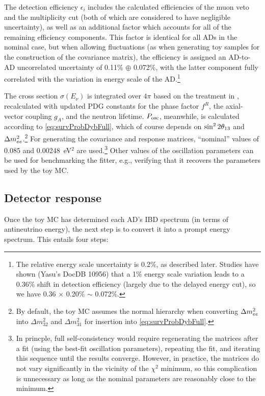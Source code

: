 \documentclass[../thesis.tex]{subfiles}
\begin{document}
The detection efficiency $\epsilon_i$ includes the calculated efficiencies of
the muon veto and the multiplicity cut (both of which are considered to have
negligible uncertainty), as well as an additional factor which accounts for all
of the remaining efficiency components. This factor is identical for all ADs in
the nominal case, but when allowing fluctuations (as when generating toy samples
for the construction of the covariance matrix), the efficiency is assigned an
AD-to-AD uncorrelated uncertainty of 0.11\% $\oplus$ 0.072\%, with the latter
component fully correlated with the variation in energy scale of the
AD.\footnote{The relative energy scale uncertainty is 0.2\%, as described
  later. Studies have shown (Yasu's DocDB 10956) that a 1\% energy scale
  variation leads to a 0.36\% shift in detection efficiency (largely due to the
  delayed energy cut), so we have 0.36 $\times$ 0.20\% $\sim$ 0.072\%.}

The cross section $\sigma(E_\nu)$ is integrated over $4\pi$ based on the
treatment in \cite{Vogel_1999}, recalculated with updated PDG constants for the
phase factor $f^R$, the axial-vector coupling $g_A$, and the neutron
lifetime. $P_\mathrm{osc}$, meanwhile, is calculated according to
\autoref{eq:survProbDybFull}, which of course depends on $\sin^2 2\theta_{13}$ and
$\Delta m^2_{ee}$.\footnote{By default, the toy MC assumes the normal hierarchy when
  converting $\Delta m^2_{ee}$ into $\Delta m^2_{32}$ and $\Delta m^2_{31}$ for
  insertion into \autoref{eq:survProbDybFull}.} For generating the covariance
and response matrices, ``nominal'' values of 0.085 and 0.00248~eV$^2$ are
used.\footnote{In princple, full self-consistency would require regenerating the
  matrices after a fit (using the best-fit oscillation parameters), repeating
  the fit, and iterating this sequence until the results converge. However, in
  practice, the matrices do not vary significantly in the vicinity of the
  $\chi^2$ minimum, so this complication is unnecessary as long as the nominal
  parameters are reasonably close to the minimum.} Other values of the
oscillation parameters can be used for benchmarking the fitter, e.g., verifying
that it recovers the parameters used by the toy MC.

\subsection{Detector response}
\label{sec:fitToyDetResponse}

Once the toy MC has determined each AD's IBD spectrum (in terms of antineutrino
energy), the next step is to convert it into a prompt energy spectrum. This
entails four steps:
\end{document}
